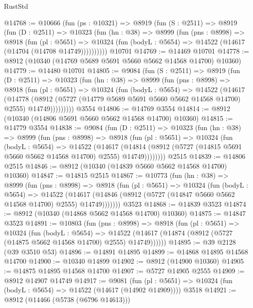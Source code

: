 \begin{lexlean}{RustStd}
\begin{coremodule}
@14768 := @10666
    (fun (ps : @10321) =>
    @8919
      (fun (S : @2511) =>
      @8919
        (fun (D : @2511) =>
        @10323
          (fun (hn : @38) =>
          @8999
            (fun (pns : @8998) =>
            @8918
              (fun (pl : @5651) =>
              @10324 (fun (bodyL : @5654) => @14522 (@14617 (@14704 (@14708 @14749))))))))))
    @10701
@14769 := @14469 @10701
@14778 := @8912 (@10340 (@14769 @5689 @5691 @5660 @5662 @14568 @14700) @10360)
@14779 := @14480 @10701
@14805 := @9084
    (fun (S : @2511) =>
    @8919
      (fun (D : @2511) =>
      @10323
        (fun (hn : @38) =>
        @8999
          (fun (pns : @8998) =>
          @8918
            (fun (pl : @5651) =>
            @10324
              (fun (bodyL : @5654) =>
              @14522
                (@14617
                  (@14778
                    (@8912
                      (@5727 (@14779 @5689 @5691 @5660 @5662 @14568 @14700) @2555)
                      @14749)))))))))
    @3554
@14806 := @14769 @3554
@14814 := @8912 (@10340 (@14806 @5691 @5660 @5662 @14568 @14700) @10360)
@14815 := @14779 @3554
@14838 := @9084
    (fun (D : @2511) =>
    @10323
      (fun (hn : @38) =>
      @8999
        (fun (pns : @8998) =>
        @8918
          (fun (pl : @5651) =>
          @10324
            (fun (bodyL : @5654) =>
            @14522
              (@14617
                (@14814 (@8912 (@5727 (@14815 @5691 @5660 @5662 @14568 @14700) @2555) @14749))))))))
    @2515
@14839 := @14806 @2515
@14846 := @8912 (@10340 (@14839 @5660 @5662 @14568 @14700) @10360)
@14847 := @14815 @2515
@14867 := @10773
    (fun (hn : @38) =>
    @8999
      (fun (pns : @8998) =>
      @8918
        (fun (pl : @5651) =>
        @10324
          (fun (bodyL : @5654) =>
          @14522
            (@14617 (@14846 (@8912 (@5727 (@14847 @5660 @5662 @14568 @14700) @2555) @14749)))))))
    @3523
@14868 := @14839 @3523
@14874 := @8912 (@10340 (@14868 @5662 @14568 @14700) @10360)
@14875 := @14847 @3523
@14891 := @10803
    (fun (pns : @8998) =>
    @8918
      (fun (pl : @5651) =>
      @10324
        (fun (bodyL : @5654) =>
        @14522 (@14617 (@14874 (@8912 (@5727 (@14875 @5662 @14568 @14700) @2555) @14749))))))
@14895 := @39 @2128 (@39 @3510 @53)
@14896 := @14891 @14895
@14899 := @14868 @14895 @14568 @14700
@14900 := @10340 @14899
@14902 := @8912 (@14900 @10360)
@14905 := @14875 @14895 @14568 @14700
@14907 := @5727 @14905 @2555
@14909 := @8912 @14907 @14749
@14917 := @9081
    (fun (pl : @5651) => @10324 (fun (bodyL : @5654) => @14522 (@14617 (@14902 @14909))))
    @3518
@14921 := @8912 (@14466 (@5738 (@6796 @14613)))

\end{coremodule}
\end{lexlean}
